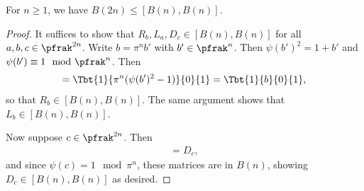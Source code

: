 \begin{lemma}
  For $n\geq 1$, we have $B(2n)\leq [B(n),B(n)]$.
\end{lemma}
\begin{proof}


  It suffices to show that $R_b,L_a,D_c\in [B(n),B(n)]$ for all $a,b,c\in \pfrak^{2n}$. Write $b = \pi^{n}b'$ with $b' \in \pfrak^n$. Then $\psi(b')^2=1+b'$  and $\psi(b')\equiv 1 \mod \pfrak^n$. Then
  \begin{align*}
    [\Tbt{\psi(b')}{}{}{1/\psi(b')},\Tbt{1}{\pi^n}{0}{1}] = \Tbt{1}{\pi^n(\psi(b')^2-1)}{0}{1} =\Tbt{1}{b}{0}{1},
  \end{align*}
  so that $R_b \in [B(n),B(n)]$. The same argument shows that $L_b \in [B(n),B(n)]$.

  Now suppose $c\in \pfrak^{2n}$. Then
  \begin{align*}
    [\Tbt{\psi(c)}{0}{-c/\pi^n\psi(c)}{-1/\psi(c)}, \Tbt{1}{\pi^n}{c/\pi^n}{c+1}] = D_c,
  \end{align*}
  and since $\psi(c)=1 \mod \pi^n$, these matrices are in $B(n)$, showing $D_c \in [B(n),B(n)] $ as desired.
\end{proof}



